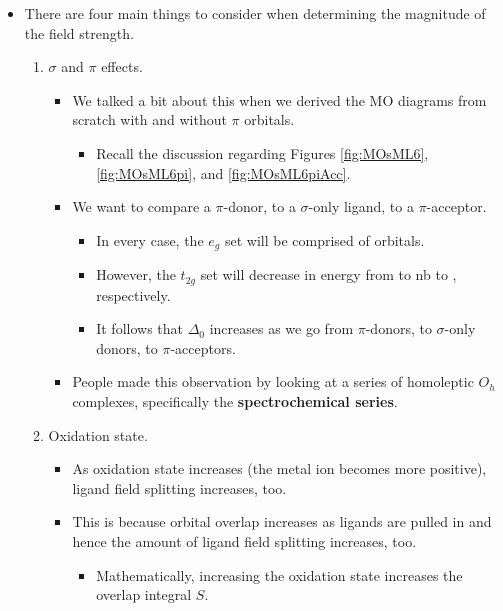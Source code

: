 \documentclass[../notes.tex]{subfiles}
\begin{document}
\begin{itemize}
\begin{itemize}
    \end{itemize}
    \item There are four main things to consider when determining the magnitude of the field strength.
    \begin{enumerate}
        \item $\sigma$ and $\pi$ effects.
        \begin{itemize}
            \item We talked a bit about this when we derived the  MO diagrams from scratch with and without $\pi$ orbitals.
            \begin{itemize}
                \item Recall the discussion regarding Figures \ref{fig:MOsML6}, \ref{fig:MOsML6pi}, and \ref{fig:MOsML6piAcc}.
            \end{itemize}
            \item We want to compare a $\pi$-donor, to a $\sigma$-only ligand, to a $\pi$-acceptor.
            \begin{itemize}
                \item In every case, the $e_g$ set will be comprised of  orbitals.
                \item However, the $t_{2g}$ set will decrease in energy from  to nb to , respectively.
                \item It follows that $\Delta_0$ increases as we go from $\pi$-donors, to $\sigma$-only donors, to $\pi$-acceptors.
            \end{itemize}
            \item People made this observation by looking at a series of homoleptic $O_h$ complexes, specifically the \textbf{spectrochemical series}.
        \end{itemize}
        \item Oxidation state.
        \begin{itemize}
            \item As oxidation state increases (the metal ion becomes more positive), ligand field splitting increases, too.
            \item This is because orbital overlap increases as ligands are pulled in and hence the amount of ligand field splitting increases, too.
            \begin{itemize}
                \item Mathematically, increasing the oxidation state increases the overlap integral $S$.
            \end{itemize}

\end{itemize}
\end{enumerate}
\end{itemize}
\end{document}
